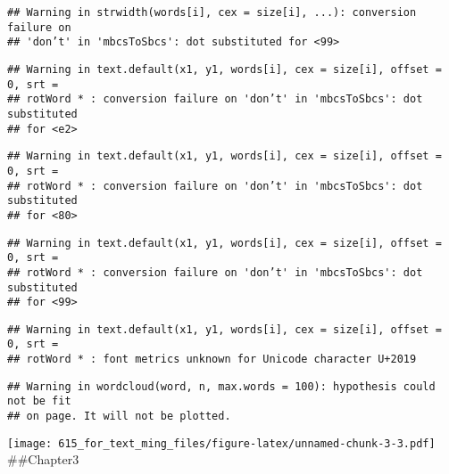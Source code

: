\documentclass[]{article}
\newenvironment{Shaded}{\begin{snugshade}}{\end{snugshade}}
\newcommand{\KeywordTok}[1]{\textcolor[rgb]{0.13,0.29,0.53}{\textbf{{#1}}}}
\newcommand{\DataTypeTok}[1]{\textcolor[rgb]{0.13,0.29,0.53}{{#1}}}
\newcommand{\DecValTok}[1]{\textcolor[rgb]{0.00,0.00,0.81}{{#1}}}
\newcommand{\StringTok}[1]{\textcolor[rgb]{0.31,0.60,0.02}{{#1}}}
\newcommand{\CommentTok}[1]{\textcolor[rgb]{0.56,0.35,0.01}{\textit{{#1}}}}
\newcommand{\OtherTok}[1]{\textcolor[rgb]{0.56,0.35,0.01}{{#1}}}
\newcommand{\NormalTok}[1]{{#1}}
\begin{document}
\begin{verbatim}
## Warning in strwidth(words[i], cex = size[i], ...): conversion failure on
## 'don’t' in 'mbcsToSbcs': dot substituted for <99>
\end{verbatim}

\begin{verbatim}
## Warning in text.default(x1, y1, words[i], cex = size[i], offset = 0, srt =
## rotWord * : conversion failure on 'don’t' in 'mbcsToSbcs': dot substituted
## for <e2>
\end{verbatim}

\begin{verbatim}
## Warning in text.default(x1, y1, words[i], cex = size[i], offset = 0, srt =
## rotWord * : conversion failure on 'don’t' in 'mbcsToSbcs': dot substituted
## for <80>
\end{verbatim}

\begin{verbatim}
## Warning in text.default(x1, y1, words[i], cex = size[i], offset = 0, srt =
## rotWord * : conversion failure on 'don’t' in 'mbcsToSbcs': dot substituted
## for <99>
\end{verbatim}

\begin{verbatim}
## Warning in text.default(x1, y1, words[i], cex = size[i], offset = 0, srt =
## rotWord * : font metrics unknown for Unicode character U+2019
\end{verbatim}

\begin{verbatim}
## Warning in wordcloud(word, n, max.words = 100): hypothesis could not be fit
## on page. It will not be plotted.
\end{verbatim}

\texttt{[image: 615\_for\_text\_ming\_files/figure-latex/unnamed-chunk-3-3.pdf]}
\#\#Chapter3

\begin{Shaded}
\end{Shaded}
\end{document}
